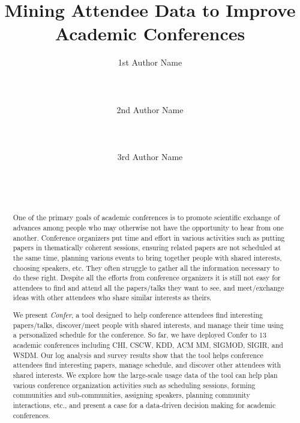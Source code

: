 \documentclass{sigchi}
\begin{document}
\title{Mining Attendee Data to Improve Academic Conferences}

\author{
  \alignauthor 1st Author Name\\
    \\
    \\
    \\
  \alignauthor 2nd Author Name\\
    \\
    \\
    \\
  \alignauthor 3rd Author Name\\
    \\
    \\
    \\
}

\maketitle

\begin{abstract}
One of the primary goals of academic conferences is to promote scientific exchange of advances among people who may otherwise not have the opportunity to hear from one another. Conference organizers put time and effort in various activities such as putting papers in thematically coherent sessions, ensuring related papers are not scheduled at the same time, planning various events to bring together people with shared interests, choosing speakers, etc.  They often struggle to gather all the information necessary to do these right. Despite all the efforts from conference organizers it is still not easy for attendees to find and attend all the papers/talks they want to see, and meet/exchange ideas with other attendees who share similar interests as theirs.

We present \emph{Confer}, a tool designed to help conference attendees find interesting papers/talks, discover/meet people with shared interests, and manage their time using a personalized schedule for the conference. So far, we have deployed Confer to 13 academic conferences including CHI, CSCW, KDD, ACM MM, SIGMOD, SIGIR, and WSDM. Our log analysis and survey results show that the tool helps conference attendees find interesting papers, manage schedule, and discover other attendees with shared interests. We explore how the large-scale usage data of the tool can help plan various conference organization activities such as scheduling sessions, forming communities and sub-communities, assigning speakers, planning community interactions, etc., and present a case for a data-driven decision making for academic conferences.
\end{abstract}
\end{document}
